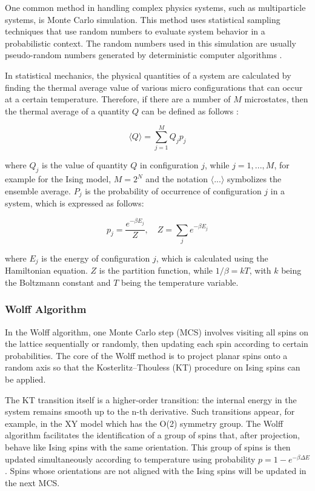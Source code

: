 One common method in handling complex physics systems, such as multiparticle systems, is Monte Carlo simulation. This method uses statistical sampling techniques that use random numbers to evaluate system behavior in a probabilistic context. The random numbers used in this simulation are usually pseudo-random numbers generated by deterministic computer algorithms \cite{Surungan2000}.

In statistical mechanics, the physical quantities of a system are calculated by finding the thermal average value of various micro configurations that can occur at a certain temperature. Therefore, if there are a number of $M$ microstates, then the thermal average of a quantity $Q$ can be defined as follows \cite{Surungan2000}:

\begin{equation}
\langle Q \rangle = \sum_{j=1}^{M} Q_j p_j
\label{eq:thermal_avg}
\end{equation}

where $Q_j$ is the value of quantity $Q$ in configuration $j$, while $j = 1, ..., M$, for example for the Ising model, $M = 2^N$ and the notation $\langle ... \rangle$ symbolizes the ensemble average. $P_j$ is the probability of occurrence of configuration $j$ in a system, which is expressed as follows:

\begin{equation}
p_j = \frac{e^{-\beta E_j}}{Z}, \quad Z = \sum_j e^{-\beta E_j}
\label{eq:probability}
\end{equation}

where $E_j$ is the energy of configuration $j$, which is calculated using the Hamiltonian equation. $Z$ is the partition function, while $1/\beta = kT$, with $k$ being the Boltzmann constant and $T$ being the temperature variable.

\subsubsection{Wolff Algorithm}

In the Wolff algorithm, one Monte Carlo step (MCS) involves visiting all spins on the lattice sequentially or randomly, then updating each spin according to certain probabilities. The core of the Wolff method is to project planar spins onto a random axis so that the Kosterlitz–Thouless (KT) procedure on Ising spins can be applied.

The KT transition itself is a higher-order transition: the internal energy in the system remains smooth up to the n-th derivative. Such transitions appear, for example, in the XY model which has the O(2) symmetry group. The Wolff algorithm facilitates the identification of a group of spins that, after projection, behave like Ising spins with the same orientation. This group of spins is then updated simultaneously according to temperature using probability $p = 1 - e^{-\beta \Delta E}$. Spins whose orientations are not aligned with the Ising spins will be updated in the next MCS.

